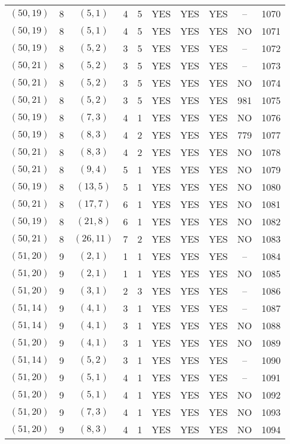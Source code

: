 \begin{longtable}{|c|c|c|c|c|c|c|c|c|c|}
$(50, 19)$ & 8 & $(5, 1)$ & 4 & 5 & YES & YES & YES & -- & 1070\\
$(50, 19)$ & 8 & $(5, 1)$ & 4 & 5 & YES & YES & YES & NO & 1071\\
$(50, 19)$ & 8 & $(5, 2)$ & 3 & 5 & YES & YES & YES & -- & 1072\\
$(50, 21)$ & 8 & $(5, 2)$ & 3 & 5 & YES & YES & YES & -- & 1073\\
$(50, 21)$ & 8 & $(5, 2)$ & 3 & 5 & YES & YES & YES & NO & 1074\\
$(50, 21)$ & 8 & $(5, 2)$ & 3 & 5 & YES & YES & YES & 981 & 1075\\
$(50, 19)$ & 8 & $(7, 3)$ & 4 & 1 & YES & YES & YES & NO & 1076\\
$(50, 19)$ & 8 & $(8, 3)$ & 4 & 2 & YES & YES & YES & 779 & 1077\\
$(50, 21)$ & 8 & $(8, 3)$ & 4 & 2 & YES & YES & YES & NO & 1078\\
$(50, 21)$ & 8 & $(9, 4)$ & 5 & 1 & YES & YES & YES & NO & 1079\\
$(50, 19)$ & 8 & $(13, 5)$ & 5 & 1 & YES & YES & YES & NO & 1080\\
$(50, 21)$ & 8 & $(17, 7)$ & 6 & 1 & YES & YES & YES & NO & 1081\\
$(50, 19)$ & 8 & $(21, 8)$ & 6 & 1 & YES & YES & YES & NO & 1082\\
$(50, 21)$ & 8 & $(26, 11)$ & 7 & 2 & YES & YES & YES & NO & 1083\\
$(51, 20)$ & 9 & $(2, 1)$ & 1 & 1 & YES & YES & YES & -- & 1084\\
$(51, 20)$ & 9 & $(2, 1)$ & 1 & 1 & YES & YES & YES & NO & 1085\\
$(51, 20)$ & 9 & $(3, 1)$ & 2 & 3 & YES & YES & YES & -- & 1086\\
$(51, 14)$ & 9 & $(4, 1)$ & 3 & 1 & YES & YES & YES & -- & 1087\\
$(51, 14)$ & 9 & $(4, 1)$ & 3 & 1 & YES & YES & YES & NO & 1088\\
$(51, 20)$ & 9 & $(4, 1)$ & 3 & 1 & YES & YES & YES & NO & 1089\\
$(51, 14)$ & 9 & $(5, 2)$ & 3 & 1 & YES & YES & YES & -- & 1090\\
$(51, 20)$ & 9 & $(5, 1)$ & 4 & 1 & YES & YES & YES & -- & 1091\\
$(51, 20)$ & 9 & $(5, 1)$ & 4 & 1 & YES & YES & YES & NO & 1092\\
$(51, 20)$ & 9 & $(7, 3)$ & 4 & 1 & YES & YES & YES & NO & 1093\\
$(51, 20)$ & 9 & $(8, 3)$ & 4 & 1 & YES & YES & YES & NO & 1094\\

\end{longtable}
